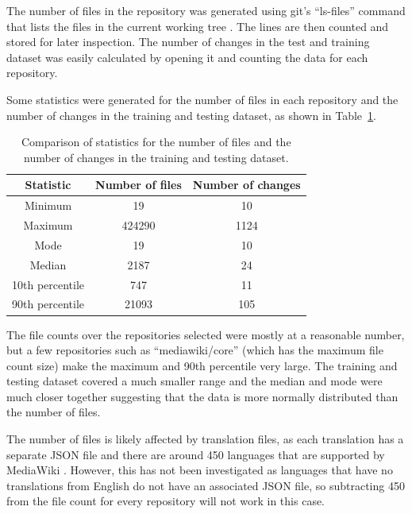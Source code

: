 The number of files in the repository was generated using git's ``ls-files'' command that lists the files in the current working tree \cite{git:ls-files}. The lines are then counted and stored for later inspection. The number of changes in the test and training dataset was easily calculated by opening it and counting the data for each repository.

Some statistics were generated for the number of files in each repository and the number of changes in the training and testing dataset, as shown in Table~\ref{table:files-vs-changes-for-x-value}.
\begin{table}[h]
\begin{center}
\begin{tabular}{@{}c c c@{}} 
\hline
\textbf{Statistic} & Number of files & Number of changes \\
\hline
Minimum & 19 & 10 \\
Maximum & 424290 & 1124 \\
Mode & 19 & 10 \\
Median & 2187 & 24 \\
10th percentile & 747 & 11 \\
90th percentile & 21093 & 105 \\
\hline
\end{tabular}
\end{center}
\caption{
\label{table:files-vs-changes-for-x-value}Comparison of statistics for the number of files and the number of changes in the training and testing dataset.}
\end{table}

\label{paragraph:mediawiki-core-being-large-in-file-count}The file counts over the repositories selected were mostly at a reasonable number, but a few repositories such as ``mediawiki/core'' (which has the maximum file count size) make the maximum and 90th percentile very large. The training and testing dataset covered a much smaller range and the median and mode were much closer together suggesting that the data is more normally distributed than the number of files.

The number of files is likely affected by translation files, as each translation has a separate JSON file and there are around 450 languages that are supported by MediaWiki . However, this has not been investigated as languages that have no translations from English do not have an associated JSON file, so subtracting 450 from the file count for every repository will not work in this case.

